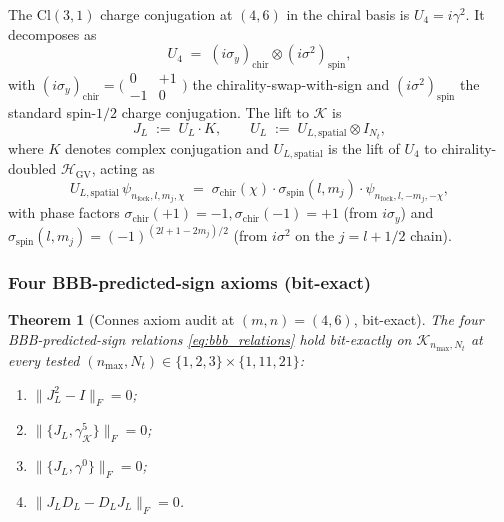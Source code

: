 \documentclass[11pt,a4paper]{article}
\theoremstyle{plain}
\newtheorem{theorem}{Theorem}[section]
\theoremstyle{definition}
\newcommand{\nmax}{n_{\max}}
\newcommand{\Nt}{N_t}
\newcommand{\Hilb}{\mathcal{H}}
\newcommand{\Krein}{\mathcal{K}}
\newcommand{\Frob}[1]{\lVert #1 \rVert_{F}}
\newcommand{\DL}{D_{L}}
\newcommand{\JL}{J_{L}}
\newcommand{\Cl}{\mathrm{Cl}}
\begin{document}
The $\Cl(3, 1)$ charge conjugation at $(4, 6)$ in the chiral basis is
$U_4 = i \gamma^2$. It decomposes as
\begin{equation}\label{eq:U4_tensor}
   U_4 \;=\; (i\sigma_y)_{\mathrm{chir}} \otimes (i\sigma^2)_{\mathrm{spin}},
\end{equation}
with $(i\sigma_y)_{\mathrm{chir}} = \bigl(\begin{smallmatrix} 0 & +1 \\
-1 & 0\end{smallmatrix}\bigr)$ the chirality-swap-with-sign and
$(i\sigma^2)_{\mathrm{spin}}$ the standard spin-$1/2$ charge
conjugation. The lift to $\Krein$ is
\begin{equation}\label{eq:JL_def}
   \JL \;:=\; U_L \cdot K,
   \qquad
   U_L \;:=\; U_{L, \mathrm{spatial}} \otimes I_{\Nt},
\end{equation}
where $K$ denotes complex conjugation and $U_{L, \mathrm{spatial}}$
is the lift of $U_4$ to chirality-doubled $\Hilb_{\mathrm{GV}}$,
acting as
\begin{equation}\label{eq:JL_action}
   U_{L, \mathrm{spatial}} \,\psi_{n_\text{fock}, l, m_j, \chi}
   \;=\; \sigma_{\mathrm{chir}}(\chi) \cdot \sigma_{\mathrm{spin}}(l, m_j)
       \cdot \psi_{n_\text{fock}, l, -m_j, -\chi},
\end{equation}
with phase factors $\sigma_{\mathrm{chir}}(+1) = -1,
\sigma_{\mathrm{chir}}(-1) = +1$ (from $i\sigma_y$) and
$\sigma_{\mathrm{spin}}(l, m_j) = (-1)^{(2l + 1 - 2m_j)/2}$ (from
$i\sigma^2$ on the $j = l + 1/2$ chain).

\subsubsection{Four BBB-predicted-sign axioms (bit-exact)}

\begin{theorem}[Connes axiom audit at $(m, n) = (4, 6)$, bit-exact]
\label{thm:connes_audit}
The four BBB-predicted-sign relations \eqref{eq:bbb_relations} hold
bit-exactly on $\Krein_{\nmax, \Nt}$ at every tested
$(\nmax, \Nt) \in \{1, 2, 3\} \times \{1, 11, 21\}$:
\begin{enumerate}\setlength{\itemsep}{2pt}
\item[(i)] $\Frob{\JL^2 - I} = 0$;
\item[(ii)] $\Frob{\{\JL, \gamma^5_{\Krein}\}} = 0$;
\item[(iii)] $\Frob{\{\JL, \gamma^0\}} = 0$;
\item[(iv)] $\Frob{\JL \DL - \DL \JL} = 0$.
\end{enumerate}
\end{theorem}
\end{document}

